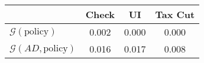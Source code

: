 \begin{tabular}{@{}lccc@{}} 
\toprule 
                          & Check      & UI    & Tax Cut    \\  \midrule 
$\mathcal{G}(\text{policy})$ & 0.002  & 0.000  & 0.000     \\ 
$\mathcal{G}(AD,\text{policy})$ & 0.016  & 0.017  & 0.008     \\ 
\end{tabular}  
